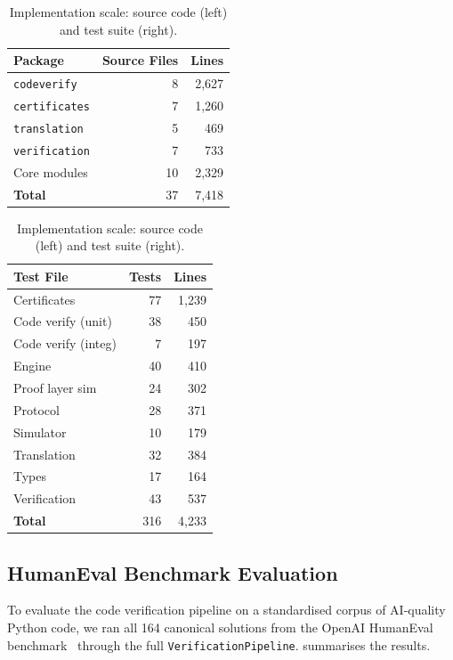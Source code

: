 \documentclass[11pt,a4paper]{article}
\begin{document}
\begin{table}[h]
\centering
\small
\begin{tabular}{@{}lrr@{}}
\toprule
\textbf{Package} & \textbf{Source Files} & \textbf{Lines} \\
\midrule
\texttt{codeverify}    & 8  & 2{,}627 \\
\texttt{certificates}  & 7  & 1{,}260 \\
\texttt{translation}   & 5  &   469 \\
\texttt{verification}  & 7  &   733 \\
Core modules           & 10 & 2{,}329 \\
\midrule
\textbf{Total}         & 37 & 7{,}418 \\
\bottomrule
\end{tabular}
\quad
\begin{tabular}{@{}lrr@{}}
\toprule
\textbf{Test File} & \textbf{Tests} & \textbf{Lines} \\
\midrule
Certificates        & 77  & 1{,}239 \\
Code verify (unit)  & 38  &   450 \\
Code verify (integ) &  7  &   197 \\
Engine              & 40  &   410 \\
Proof layer sim     & 24  &   302 \\
Protocol            & 28  &   371 \\
Simulator           & 10  &   179 \\
Translation         & 32  &   384 \\
Types               & 17  &   164 \\
Verification        & 43  &   537 \\
\midrule
\textbf{Total}      & 316 & 4{,}233 \\
\bottomrule
\end{tabular}
\caption{Implementation scale: source code (left) and test suite
  (right).}
\label{tab:scale}
\end{table}

\subsection{HumanEval Benchmark Evaluation}

To evaluate the code verification pipeline on a standardised corpus of
AI-quality Python code, we ran all 164 canonical solutions from the
OpenAI HumanEval benchmark~\citep{humaneval2021} through the full
\texttt{VerificationPipeline}.   summarises the
results.
\end{document}
